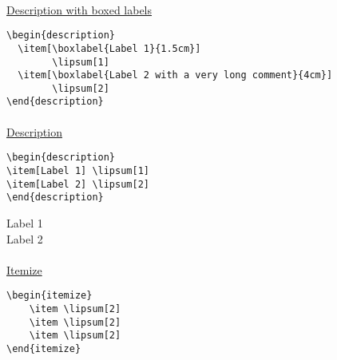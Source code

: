 \paragraph*{} \underline{Description with boxed labels}
\begin{verbatim}
\begin{description}
  \item[\boxlabel{Label 1}{1.5cm}]
        \lipsum[1]
  \item[\boxlabel{Label 2 with a very long comment}{4cm}]
        \lipsum[2]
\end{description}
\end{verbatim}

\begin{description}
  \item[]
        \lipsum[1]
  \item[]
         \lipsum[2]
\end{description}

\paragraph*{} \underline{Description}
\begin{verbatim}
\begin{description}
\item[Label 1] \lipsum[1]
\item[Label 2] \lipsum[2]
\end{description}
\end{verbatim}

\begin{description}
\item[Label 1] \lipsum[1]
\item[Label 2] \lipsum[2]
\end{description}

\paragraph*{} \underline{Itemize}
\begin{verbatim}
\begin{itemize}
    \item \lipsum[2]
    \item \lipsum[2]
    \item \lipsum[2]
\end{itemize}
\end{verbatim}

